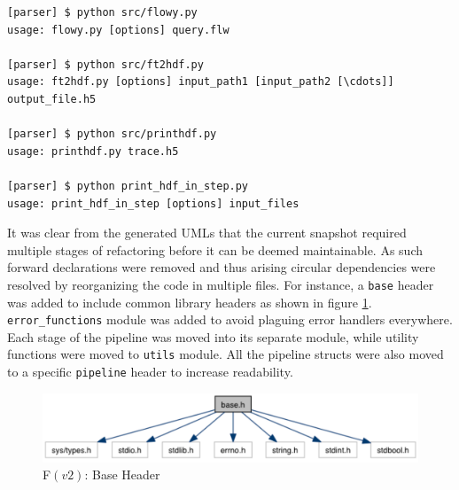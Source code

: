 \begin{lstlisting}
[parser] $ python src/flowy.py
usage: flowy.py [options] query.flw

[parser] $ python src/ft2hdf.py
usage: ft2hdf.py [options] input_path1 [input_path2 [\cdots]] output_file.h5

[parser] $ python src/printhdf.py
usage: printhdf.py trace.h5

[parser] $ python print_hdf_in_step.py
usage: print_hdf_in_step [options] input_files
\end{lstlisting}

It was clear from the generated \ac{UML}s that the current snapshot required
multiple stages of refactoring before it can be deemed maintainable. As such
forward declarations were removed and thus arising circular dependencies were
resolved by reorganizing the code in multiple files. For   instance, a \texttt{base} header was added to include common library
headers as shown in figure \ref{fig:base-header}.  \texttt{error\_functions}
module was added to avoid plaguing error handlers everywhere. Each stage of
the pipeline was moved into its separate module, while utility functions were
moved to \texttt{utils} module. All the pipeline structs were also moved to a
specific \texttt{pipeline} header to increase readability.

\begin{figure}[h!]
  \begin{center}
    \includegraphics* [width=1.0\linewidth]{figures/base-header}
    \caption{F$(v2)$: Base Header}
    \label{fig:base-header}
    \end{center}
\end{figure}
